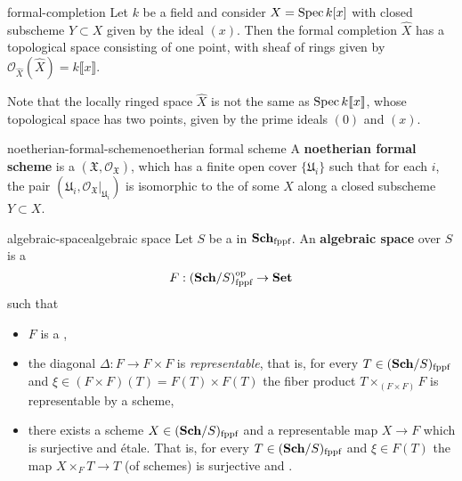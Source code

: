 \begin{example}{formal-completion}
    Let $k$ be a field and consider $X = \operatorname{Spec} k[x]$ with closed subscheme $Y \subset X$ given by the ideal $(x)$. Then the formal completion $\hat{X}$ has a topological space consisting of one point, with sheaf of rings given by $\mathcal{O}_{\hat{X}}(\hat{X}) = k \llbracket x \rrbracket$.
    
    Note that the locally ringed space $\hat{X}$ is not the same as $\operatorname{Spec} k \llbracket x \rrbracket$, whose topological space has two points, given by the prime ideals $(0)$ and $(x)$.
\end{example}

\begin{topic}{noetherian-formal-scheme}{noetherian formal scheme}
    A \textbf{noetherian formal scheme} is a  $(\mathfrak{X}, \mathcal{O}_\mathfrak{X})$, which has a finite open cover $\{ \mathfrak{U}_i \}$ such that for each $i$, the pair $(\mathfrak{U}_i, \mathcal{O}_\mathfrak{X}|_{\mathfrak{U}_i})$ is isomorphic to the  of some  $X$ along a closed subscheme $Y \subset X$.
\end{topic}

\begin{topic}{algebraic-space}{algebraic space}
    Let $S$ be a  in $\textbf{Sch}_\textup{fppf}$. An \textbf{algebraic space} over $S$ is a 
    \[ F : (\textbf{Sch}/S)_\textup{fppf}^\textup{op} \to \textbf{Set} \]
    such that
    \begin{itemize}
        \item $F$ is a ,
        \item the diagonal $\Delta : F \to F \times F$ is \textit{representable}, that is, for every $T \in (\textbf{Sch}/S)_\textup{fppf}$ and $\xi \in (F \times F)(T) = F(T) \times F(T)$ the fiber product $T \times_{(F \times F)} F$ is representable by a scheme,
        \item there exists a scheme $X \in (\textbf{Sch}/S)_\textup{fppf}$ and a representable map $X \to F$ which is surjective and étale. That is, for every $T \in (\textbf{Sch}/S)_\textup{fppf}$ and $\xi \in F(T)$ the map $X \times_F T \to T$ (of schemes) is surjective and .
    \end{itemize}
\end{topic}

